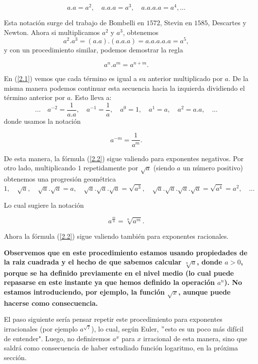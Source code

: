 \documentclass[a4paper,10pt,BCOR10mm,oneside,headsepline]{scrbook}
\newcounter{qr}
\begin{document}
\begin{equation}\label{2.1}
a.a=a^2, \quad a.a.a=a^3, \quad a.a.a.a=a^4, ...
\end{equation} 

Esta notación surge del trabajo de Bombelli en $1572$, Stevin en $1585$, Descartes y Newton. Ahora si multiplicamos $a^2$ y $a^3$, obtenemos $$a^2.a^3=(a.a).(a.a.a)= a.a.a.a.a=a^5,$$
y con un procedimiento similar, podemos demostrar la regla

\begin{equation}\label{2.2}
a^n.a^m=a^{n+m}.
\end{equation} 

En (\ref{2.1}) vemos que cada término es igual a su anterior multiplicado por $a$. De la misma manera podemos continuar esta secuencia hacia la izquierda dividiendo el término anterior por $a$. Esto lleva a:
$$...\quad a^{-2}=\frac{1}{a.a},\quad a^{-1}=\frac{1}{a},\quad a^0=1,\quad a^1=a,\quad a^2=a.a,\quad...$$
donde usamos la notación 

\begin{equation}\label{2.3}
a^{-m}=\frac{1}{a^m}.
\end{equation} 

De esta manera, la fórmula (\ref{2.2}) sigue valiendo para exponentes negativos. Por otro lado, multiplicando $1$ repetidamente por $\sqrt{a}$ (siendo $a$ un número positivo) obtenemos una progresión geométrica 
$$1, \quad \sqrt{a}, \quad \sqrt{a}.\sqrt{a}=a, \quad \sqrt{a}.\sqrt{a}.\sqrt{a}=\sqrt{a^3}, \quad \sqrt{a}.\sqrt{a}.\sqrt{a}.\sqrt{a}=\sqrt{a^4}=a^2, \quad ...$$

Lo cual sugiere la notación

\begin{equation}\label{2.4}
a^{\frac{m}{n}}=\sqrt[n]{a^m}.
\end{equation} 

Ahora la fórmula (\ref{2.2}) sigue valiendo también para exponentes racionales.

\textbf{Observemos que en este procedimiento estamos usando propiedades de la raiz cuadrada y el hecho de que sabemos calcular $\sqrt[n]{a}$, donde $a>0$, porque se ha definido previamente en el nivel medio (lo cual puede repasarse en este instante ya que hemos definido la operación $a^n$). No estamos introduciendo, por ejemplo, la función $\sqrt{x}$, aunque puede hacerse como consecuencia.}

El paso siguiente sería pensar repetir este procedimiento para exponentes irracionales (por ejemplo $a^{\sqrt{7}}$), lo cual, según Euler, $"$esto es un poco más difícil de entender". Luego, no definiremos $a^x$ para $x$ irracional de esta manera, sino que saldrá como consecuencia de haber estudiado función logaritmo, en la próxima sección.
\end{document}
